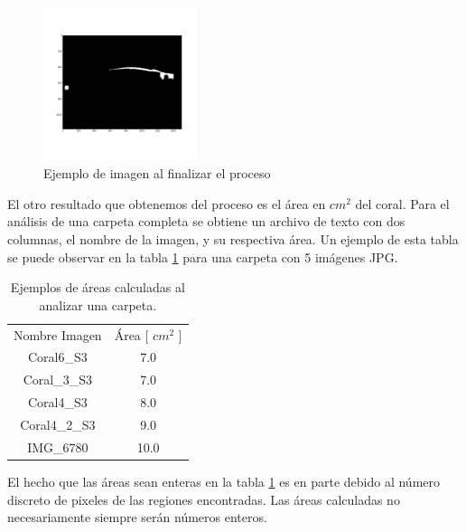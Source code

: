 \documentclass[journal]{IEEEtran}
\begin{document}
\begin{figure}[ht]
\begin{center}
\includegraphics[width=0.40\textwidth]{resultados/Coral4_2_S2_final} %
\caption{Ejemplo de imagen al finalizar el proceso}
\label{fg:final_2}
\end{center}
\end{figure}
\FloatBarrier

\begin{par}
El otro resultado que obtenemos del proceso es el área en $cm^2$ del
coral. Para el análisis de una carpeta completa se obtiene un archivo de
texto con dos columnas, el nombre de la imagen, y su respectiva área. Un
ejemplo de esta tabla se puede observar en la tabla \ref{tab:results}
para una carpeta con 5 imágenes JPG.
\end{par}

\begin{table}[ht]
    \centering
    \begin{tabular}{|c|c|}
        Nombre Imagen & Área [ $ cm^2 $ ] \\
        Coral6\_S3   &  7.0 \\
        Coral\_3\_S3  &  7.0 \\
        Coral4\_S3   &  8.0 \\
        Coral4\_2\_S3 &  9.0 \\
        IMG\_6780    &  10.0 
    \end{tabular}
    \caption{Ejemplos de áreas calculadas al analizar una carpeta.}
    \label{tab:results}
\end{table}
\FloatBarrier

\begin{par}
El hecho que las áreas sean enteras en la tabla \ref{tab:results} es en
parte debido al número discreto de pixeles de las regiones encontradas.
Las áreas calculadas no necesariamente siempre serán números enteros. \\
\end{par}
\end{document}
